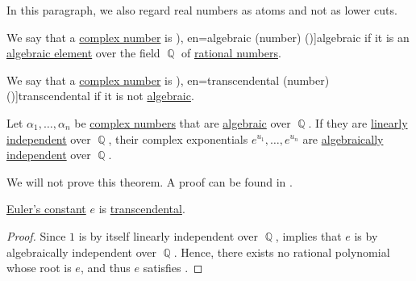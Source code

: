 In this paragraph, we also regard real numbers as atoms and not as lower cuts.

\begin{definition}\label{def:algebraic_number}
  We say that a \hyperref[def:complex_numbers]{complex number} is \term[bg=алгебрично (число), ru=алгебраическое (число) (\cite[358]{Курош1968КурсВысшейАлгебры}), en=algebraic (number) (\cite[16]{Carothers2000RealAnalysis})]{algebraic} if it is an \hyperref[def:algebraic_element]{algebraic element} over the field \( \BbbQ \) of \hyperref[def:rational_numbers]{rational numbers}.
\end{definition}

\begin{definition}\label{def:transcendental_number}
  We say that a \hyperref[def:complex_numbers]{complex number} is \term[bg=трансцендентно (число), ru=трансцендентное (число) (\cite[358]{Курош1968КурсВысшейАлгебры}), en=transcendental (number) (\cite[277]{Jacobson1985BasicAlgebraI})]{transcendental} if it is not \hyperref[def:algebraic_number]{algebraic}.
\end{definition}

\begin{theorem}\label{thm:lindemann_weierstrass}
  Let \( \alpha_1, \ldots, \alpha_n \) be \hyperref[def:complex_numbers]{complex numbers} that are \hyperref[def:algebraic_number]{algebraic} over \( \BbbQ \). If they are \hyperref[def:linear_dependence]{linearly independent} over \( \BbbQ \), their complex exponentials \( e^{u_1}, \ldots, e^{u_n} \) are \hyperref[def:algebraic_dependence]{algebraically independent} over \( \BbbQ \).
\end{theorem}
\begin{comments}
  \item We will not prove this theorem. A proof can be found in \cite[277]{Jacobson1985BasicAlgebraI}.
\end{comments}

\begin{corollary}\label{thm:eulers_constant_is_transcendental}
  \hyperref[def:exponential_function]{Euler's constant} \( e \) is \hyperref[def:transcendental_number]{transcendental}.
\end{corollary}
\begin{proof}
  Since \( 1 \) is by itself linearly independent over \( \BbbQ \),  implies that \( e \) is by algebraically independent over \( \BbbQ \). Hence, there exists no rational polynomial whose root is \( e \), and thus \( e \) satisfies .
\end{proof}

